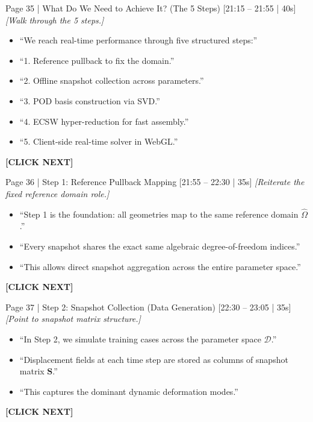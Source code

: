 \documentclass[9pt,a4paper]{article}
\begin{document}
\begin{slidebox}{Page 35 | What Do We Need to Achieve It? (The 5 Steps) \hfill [21:15 -- 21:55 | 40s]}
\textit{[Walk through the 5 steps.]}
\begin{itemize}
  \item ``We reach real-time performance through five structured steps:''
  \item ``1. Reference pullback to fix the domain.''
  \item ``2. Offline snapshot collection across parameters.''
  \item ``3. POD basis construction via SVD.''
  \item ``4. ECSW hyper-reduction for fast assembly.''
  \item ``5. Client-side real-time solver in WebGL.''
\end{itemize}
\textbf{\color{cnamred}[CLICK NEXT]}
\end{slidebox}

\begin{slidebox}{Page 36 | Step 1: Reference Pullback Mapping \hfill [21:55 -- 22:30 | 35s]}
\textit{[Reiterate the fixed reference domain role.]}
\begin{itemize}
  \item ``Step 1 is the foundation: all geometries map to the same reference domain $\hat{\Omega}$.''
  \item ``Every snapshot shares the exact same algebraic degree-of-freedom indices.''
  \item ``This allows direct snapshot aggregation across the entire parameter space.''
\end{itemize}
\textbf{\color{cnamred}[CLICK NEXT]}
\end{slidebox}

\begin{slidebox}{Page 37 | Step 2: Snapshot Collection (Data Generation) \hfill [22:30 -- 23:05 | 35s]}
\textit{[Point to snapshot matrix structure.]}
\begin{itemize}
  \item ``In Step 2, we simulate training cases across the parameter space $\mathcal{D}$.''
  \item ``Displacement fields at each time step are stored as columns of snapshot matrix $\mathbf{S}$.''
  \item ``This captures the dominant dynamic deformation modes.''
\end{itemize}
\textbf{\color{cnamred}[CLICK NEXT]}
\end{slidebox}
\end{document}
